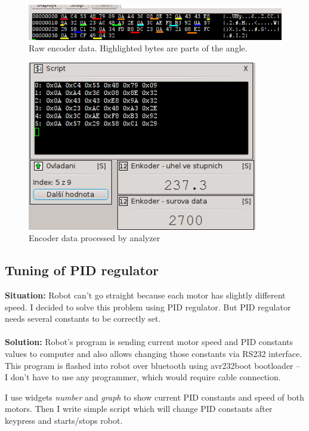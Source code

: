 \documentclass[12pt, a4paper, oneside]{article}
\newcommand{\It}{\textit}  %
\begin{document}
\begin{figure}[H]
\begin{center}
\includegraphics{img/use_enc_term.png}
\caption{Raw encoder data. Highlighted bytes are parts of the angle.}
\end{center}
\end{figure}

\begin{figure}[H]
\begin{center}
\includegraphics{img/use_enc_analyzer.png}
\caption{Encoder data processed by analyzer}
\end{center}
\end{figure}

\newpage
\subsection{Tuning of PID regulator}
{\bf Situation:} Robot can't go straight because each motor has slightly different speed. I decided to solve this problem using PID regulator. But PID regulator needs several constants to be correctly set. \\
\\
{\bf Solution:} Robot's program is sending current motor speed and PID constants values to computer and also allows changing those constants via RS232 interface. This program is flashed into robot over bluetooth using avr232boot bootloader -- I don't have to use any programmer, which would require cable connection.

I use widgets \It{number} and \It{graph} to show current PID constants and speed of both motors. Then I write simple script which will change PID constants after keypress and starts/stops robot.
\end{document}
